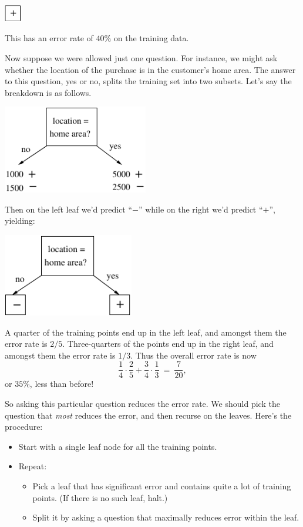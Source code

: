 \begin{center}
\includegraphics[width=0.3in]{figs/decision1.pdf}
\end{center}

\noindent
This has an error rate of $40\%$ on the training data.

Now suppose we were allowed just one question. For instance, we might ask whether
the location of the purchase is in the customer's home area. The answer to this 
question, yes or no, splits the training set into two subsets. Let's say the
breakdown is as follows.

\begin{center}
\includegraphics[width=2.5in]{figs/decision2.pdf}
\end{center}

\noindent
Then on the left leaf we'd predict ``$-$'' while on the right we'd predict
``$+$'', yielding:

\begin{center}
\includegraphics[width=2.25in]{figs/decision3.pdf}
\end{center}

A quarter of the training points end up in the left leaf, and amongst them the
error rate is $2/5$. Three-quarters of the points end up in the right leaf, and
amongst them the error rate is $1/3$. Thus the overall error rate is now
$$ \frac{1}{4} \cdot \frac{2}{5} + \frac{3}{4} \cdot \frac{1}{3} 
\ = \ \frac{7}{20},$$
or $35\%$, less than before!

So asking this particular question reduces the error rate. We should pick the
question that {\it most} reduces the error, and then recurse on the leaves. Here's
the procedure:
\begin{itemize}
\item Start with a single leaf node for all the training points.
\item Repeat:
\begin{itemize}
\item Pick a leaf that has significant error and contains quite a lot of training points.
(If there is no such leaf, halt.)
\item Split it by asking a question that maximally reduces error within the leaf.
\end{itemize}
\end{itemize}

